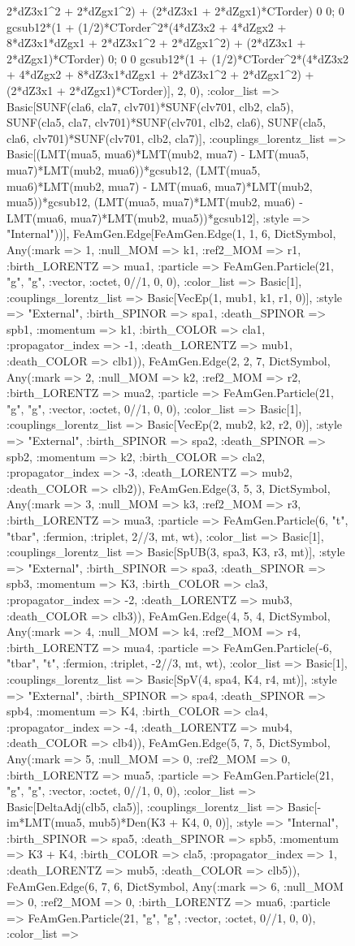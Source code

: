 \documentclass{revtex4}
\begin{document}
\begin{figure}[!htb]
\begin{center}
{2*dZ3x1^2 + 2*dZgx1^2) + (2*dZ3x1 + 2*dZgx1)*CTorder) 0 0; 0 gcsub12*(1 + (1/2)*CTorder^2*(4*dZ3x2 + 4*dZgx2 + 8*dZ3x1*dZgx1 + 2*dZ3x1^2 + 2*dZgx1^2) + (2*dZ3x1 + 2*dZgx1)*CTorder) 0; 0 0 gcsub12*(1 + (1/2)*CTorder^2*(4*dZ3x2 + 4*dZgx2 + 8*dZ3x1*dZgx1 + 2*dZ3x1^2 + 2*dZgx1^2) + (2*dZ3x1 + 2*dZgx1)*CTorder)], 2, 0), :color_list => Basic[SUNF(cla6, cla7, clv701)*SUNF(clv701, clb2, cla5), SUNF(cla5, cla7, clv701)*SUNF(clv701, clb2, cla6), SUNF(cla5, cla6, clv701)*SUNF(clv701, clb2, cla7)], :couplings_lorentz_list => Basic[(LMT(mua5, mua6)*LMT(mub2, mua7) - LMT(mua5, mua7)*LMT(mub2, mua6))*gcsub12, (LMT(mua5, mua6)*LMT(mub2, mua7) - LMT(mua6, mua7)*LMT(mub2, mua5))*gcsub12, (LMT(mua5, mua7)*LMT(mub2, mua6) - LMT(mua6, mua7)*LMT(mub2, mua5))*gcsub12], :style => "Internal"))], FeAmGen.Edge[FeAmGen.Edge(1, 1, 6, Dict{Symbol, Any}(:mark => 1, :null_MOM => k1, :ref2_MOM => r1, :birth_LORENTZ => mua1, :particle => FeAmGen.Particle(21, "g", "g", :vector, :octet, 0//1, 0, 0), :color_list => Basic[1], :couplings_lorentz_list => Basic[VecEp(1, mub1, k1, r1, 0)], :style => "External", :birth_SPINOR => spa1, :death_SPINOR => spb1, :momentum => k1, :birth_COLOR => cla1, :propagator_index => -1, :death_LORENTZ => mub1, :death_COLOR => clb1)), FeAmGen.Edge(2, 2, 7, Dict{Symbol, Any}(:mark => 2, :null_MOM => k2, :ref2_MOM => r2, :birth_LORENTZ => mua2, :particle => FeAmGen.Particle(21, "g", "g", :vector, :octet, 0//1, 0, 0), :color_list => Basic[1], :couplings_lorentz_list => Basic[VecEp(2, mub2, k2, r2, 0)], :style => "External", :birth_SPINOR => spa2, :death_SPINOR => spb2, :momentum => k2, :birth_COLOR => cla2, :propagator_index => -3, :death_LORENTZ => mub2, :death_COLOR => clb2)), FeAmGen.Edge(3, 5, 3, Dict{Symbol, Any}(:mark => 3, :null_MOM => k3, :ref2_MOM => r3, :birth_LORENTZ => mua3, :particle => FeAmGen.Particle(6, "t", "tbar", :fermion, :triplet, 2//3, mt, wt), :color_list => Basic[1], :couplings_lorentz_list => Basic[SpUB(3, spa3, K3, r3, mt)], :style => "External", :birth_SPINOR => spa3, :death_SPINOR => spb3, :momentum => K3, :birth_COLOR => cla3, :propagator_index => -2, :death_LORENTZ => mub3, :death_COLOR => clb3)), FeAmGen.Edge(4, 5, 4, Dict{Symbol, Any}(:mark => 4, :null_MOM => k4, :ref2_MOM => r4, :birth_LORENTZ => mua4, :particle => FeAmGen.Particle(-6, "tbar", "t", :fermion, :triplet, -2//3, mt, wt), :color_list => Basic[1], :couplings_lorentz_list => Basic[SpV(4, spa4, K4, r4, mt)], :style => "External", :birth_SPINOR => spa4, :death_SPINOR => spb4, :momentum => K4, :birth_COLOR => cla4, :propagator_index => -4, :death_LORENTZ => mub4, :death_COLOR => clb4)), FeAmGen.Edge(5, 7, 5, Dict{Symbol, Any}(:mark => 5, :null_MOM => 0, :ref2_MOM => 0, :birth_LORENTZ => mua5, :particle => FeAmGen.Particle(21, "g", "g", :vector, :octet, 0//1, 0, 0), :color_list => Basic[DeltaAdj(clb5, cla5)], :couplings_lorentz_list => Basic[-im*LMT(mua5, mub5)*Den(K3 + K4, 0, 0)], :style => "Internal", :birth_SPINOR => spa5, :death_SPINOR => spb5, :momentum => K3 + K4, :birth_COLOR => cla5, :propagator_index => 1, :death_LORENTZ => mub5, :death_COLOR => clb5)), FeAmGen.Edge(6, 7, 6, Dict{Symbol, Any}(:mark => 6, :null_MOM => 0, :ref2_MOM => 0, :birth_LORENTZ => mua6, :particle => FeAmGen.Particle(21, "g", "g", :vector, :octet, 0//1, 0, 0), :color_list => }
\end{center}
\end{figure}
\end{document}
